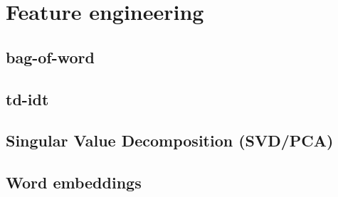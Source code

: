 \chapter{Feature engineering}

\section{bag-of-word}

\section{td-idt}

\section{Singular Value Decomposition (SVD/PCA)}

\section{Word embeddings}
